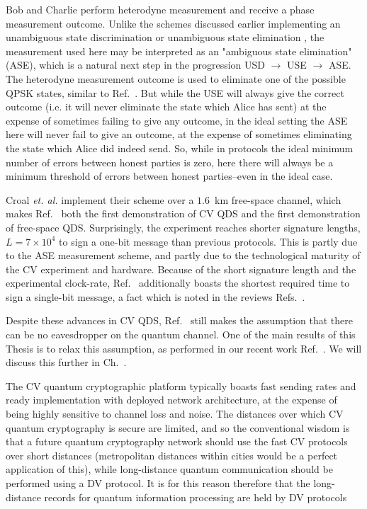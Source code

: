 Bob and Charlie perform heterodyne measurement and receive a phase measurement outcome. Unlike the schemes discussed earlier implementing an unambiguous state discrimination  or unambiguous state elimination \cite{Donaldson2016}, the measurement used here may be interpreted as an "ambiguous state elimination" (ASE), which is a natural next step in the progression USD $\rightarrow$ USE $\rightarrow$ ASE. The heterodyne measurement outcome is used to eliminate one of the possible QPSK states, similar to Ref.~\cite{Donaldson2016}. But while the USE will always give the correct outcome (i.e. it will never eliminate the state which Alice has sent) at the expense of sometimes failing to give any outcome, in the ideal setting the ASE here will never fail to give an outcome, at the expense of sometimes eliminating the state which Alice did indeed send. So, while in protocols  the ideal minimum number of errors between honest parties is zero, here there will always be a minimum threshold of errors between honest parties--even in the ideal case.

Croal \emph{et. al.} implement their scheme over a $1.6$~km free-space channel, which makes Ref.~\cite{Croal2016} both the first demonstration of CV QDS and the first demonstration of free-space QDS. Surprisingly, the experiment reaches shorter signature lengths, $L = 7 \times 10^4$ to sign a one-bit message than previous protocols. This is partly due to the ASE measurement scheme, and partly due to the technological maturity of the CV experiment and hardware. Because of the short signature length and the experimental clock-rate, Ref.~\cite{Croal2016} additionally boasts the shortest required time to sign a single-bit message, a fact which is noted in the reviews Refs.~\cite{Collins2016, Collins2018}.

Despite these advances in CV QDS, Ref.~\cite{Croal2016} still makes the assumption that there can be no eavesdropper on the quantum channel. One of the main results of this Thesis is to relax this assumption, as performed in our recent work Ref.~\cite{Thornton2019}. We will discuss this further in Ch.~.

The CV quantum cryptographic platform typically boasts fast sending rates and ready implementation with deployed network architecture, at the expense of being highly sensitive to channel loss and noise. The distances over which CV quantum cryptography is secure are limited, and so the conventional wisdom is that a future quantum cryptography network should use the fast CV protocols over short distances (metropolitan distances within cities would be a perfect application of this), while long-distance quantum communication should be performed using a DV protocol. It is for this reason therefore that the long-distance records for quantum information processing are held by DV protocols 



